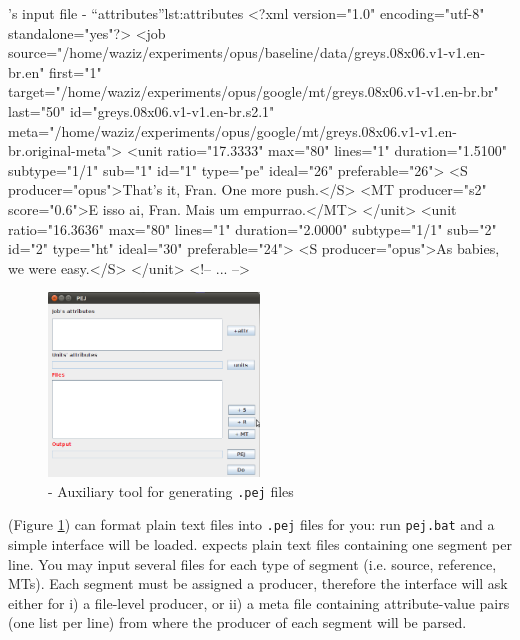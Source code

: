 \begin{workflow-code}{\PET's input file - ``attributes''}{lst:attributes}
<?xml version="1.0" encoding="utf-8" standalone="yes"?>
<job source="/home/waziz/experiments/opus/baseline/data/greys.08x06.v1-v1.en-br.en"
     first="1"
     target="/home/waziz/experiments/opus/google/mt/greys.08x06.v1-v1.en-br.br"
     last="50"
     id="greys.08x06.v1-v1.en-br.s2.1"
     meta="/home/waziz/experiments/opus/google/mt/greys.08x06.v1-v1.en-br.original-meta">
  <unit ratio="17.3333"
        max="80"
        lines="1"
        duration="1.5100"
        subtype="1/1"
        sub="1"
        id="1"
        type="pe"
        ideal="26"
        preferable="26">
    <S producer="opus">That's it, Fran. One more push.</S>
    <MT producer="s2" score="0.6">E isso ai, Fran. Mais um empurrao.</MT>
  </unit>
  <unit ratio="16.3636"
        max="80"
        lines="1"
        duration="2.0000"
        subtype="1/1"
        sub="2"
        id="2"
        type="ht"
        ideal="30"
        preferable="24">
    <S producer="opus">As babies, we were easy.</S>
  </unit>
  <!-- ... -->
 \end{workflow-code}


\begin{figure}[h]\label{fig:pejtool}
\centering
\includegraphics[width=0.5\textwidth]{img/PEJ}
\caption{\PEJ - Auxiliary tool for generating {\tt .pej} files}
\end{figure}


\PEJ (Figure \ref{fig:pejtool}) can format plain text files into {\tt .pej} files for you: run {\tt pej.bat} and a simple interface will be loaded.
\PEJ expects plain text files containing one segment per line. You may input several files for each type of segment (i.e. source, reference, MTs). Each segment must be assigned a producer, therefore the interface will ask either for i) a file-level producer, or ii) a meta file containing attribute-value pairs (one list per line) from where the producer of each segment will be parsed.

